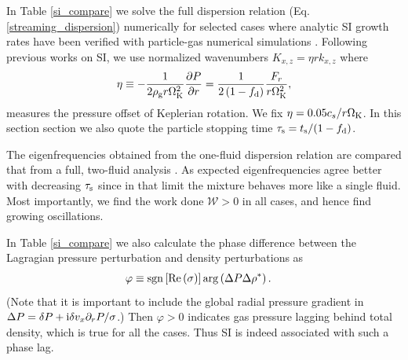 
In Table \ref{si_compare} we solve the full dispersion relation
(Eq. \ref{streaming_dispersion}) numerically for selected cases where
analytic SI growth rates have been verified with particle-gas
numerical simulations \citep[namely][]{youdin07b,bai10b}.  
Following previous works on SI, we use normalized 
wavenumbers $K_{x,z} = \eta r k_{x,z}$ where
\begin{align} 
  \eta \equiv -\frac{1}{2\rho_\mathrm{g} r\Omega_{\rm K}^2}\frac{\partial P}{\partial r} = 
  \frac{1}{2\left(1-f_\mathrm{d}\right)}\frac{F_r}{r\Omega_{\rm K}^2}, 
\end{align} 
measures the pressure offset of Keplerian rotation. We fix 
$\eta=0.05c_s/r\Omega_{\rm K}$. In this section section we also quote the
particle stopping time $\tau_\mathrm{s}=t_\mathrm{s}/(1-f_\mathrm{d})$.    

The eigenfrequencies obtained from the one-fluid dispersion relation 
are compared that from a full, two-fluid analysis \citep[similar 
to][]{youdin05a, kowalik13}. As expected eigenfrequencies agree better
with decreasing $\tau_\mathrm{s}$ since in that limit the mixture behaves more 
like a single fluid. Most importantly, we find the work done
$\mathcal{W}>0$ in all cases, and hence find growing oscillations. 



In Table \ref{si_compare} we also calculate the phase difference
between the Lagragian pressure perturbation and density perturbations
as    
\begin{align*} 
\varphi&\equiv \operatorname{sgn}{\left[\operatorname{Re}{(\sigma)}\right]}\arg\left(\Delta
  P\Delta\rho^*\right).\notag 
\end{align*}
(Note that it is important to include 
the global radial pressure gradient in $\Delta P = \delta P + \mathrm{i} \delta v_x \partial_rP/\sigma$.) Then 
$\varphi > 0 $ indicates gas pressure lagging behind total density, 
which is true for all the cases. Thus SI is indeed associated with
such a phase lag.


